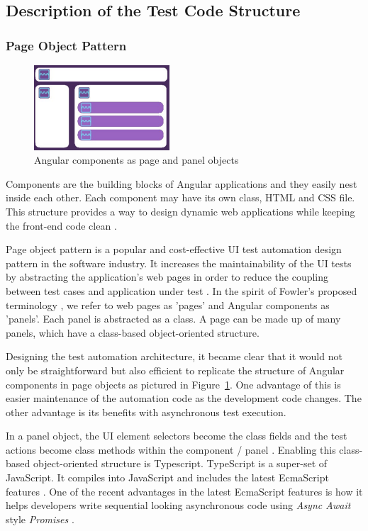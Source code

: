 \documentclass[conference]{IEEEtran}
\begin{document}
\subsection{Description of the Test Code Structure}

	\subsubsection{Page Object Pattern}

	\begin{figure}[!b]
		\includegraphics[width=0.45\textwidth,]{angular.pdf}
	\caption{Angular components as page and panel objects}
	\label{fig:angular}
	\end{figure}

	Components are the building blocks of Angular applications and they easily nest inside each other.
	Each component may have its own class, HTML and CSS file. This structure provides a way to design dynamic web applications while keeping the front-end code clean \cite{wiki:angular}. 

	Page object pattern is a popular and cost-effective UI test automation design pattern in the software industry.
	It increases the maintainability of the UI tests by abstracting the application's web pages in order to reduce the coupling between test cases and application under test \cite{leotta2013improving}.
	In the spirit of Fowler's proposed terminology \cite{fowler:pageobject}, we refer to web pages as 'pages' and Angular components as 'panels'.
	Each panel is abstracted as a class. A page can be made up of many panels, which have a class-based object-oriented structure.   

	Designing the test automation architecture, it became clear that it would not only be straightforward but also efficient to replicate the structure of Angular components in page objects as pictured in Figure~\ref{fig:angular}.
	One advantage of this is easier maintenance of the automation code as the development code changes.
	The other advantage is its benefits with asynchronous test execution.

	In a panel object, the UI element selectors become the class fields and the test actions become class methods within the component / panel \cite{protractorstyleguide}.
	Enabling this class-based object-oriented structure is Typescript.
	TypeScript is a super-set of JavaScript. It compiles into JavaScript and includes the latest EcmaScript features \cite{wiki:typescript}.
	One of the recent advantages in the latest EcmaScript features is how it helps developers write sequential looking asynchronous code using \emph{Async Await} style \emph{Promises} \cite{wiki:ECMAscript}.
\end{document}
